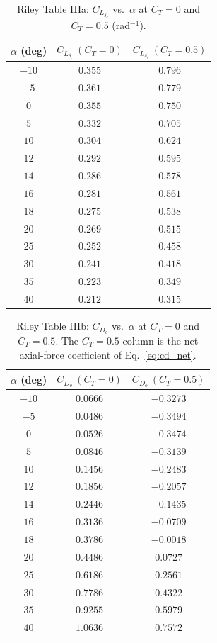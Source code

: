 \documentclass[journal ]{new-aiaa}
\begin{document}
\begin{table}[H]
\centering
\caption{Riley Table IIIa: $C_{L_{\delta_e}}$ vs.\ $\alpha$ at $C_T = 0$ and $C_T = 0.5$ (rad$^{-1}$).}
\label{tab:riley_clde}
\begin{tabular}{ccc}
\toprule
$\alpha$ (deg) & $C_{L_{\delta_e}}\ (C_T{=}0)$ & $C_{L_{\delta_e}}\ (C_T{=}0.5)$ \\
\midrule
$-10$ & $0.355$ & $0.796$ \\
$-5$  & $0.361$ & $0.779$ \\
$ 0$  & $0.355$ & $0.750$ \\
$ 5$  & $0.332$ & $0.705$ \\
$10$  & $0.304$ & $0.624$ \\
$12$  & $0.292$ & $0.595$ \\
$14$  & $0.286$ & $0.578$ \\
$16$  & $0.281$ & $0.561$ \\
$18$  & $0.275$ & $0.538$ \\
$20$  & $0.269$ & $0.515$ \\
$25$  & $0.252$ & $0.458$ \\
$30$  & $0.241$ & $0.418$ \\
$35$  & $0.223$ & $0.349$ \\
$40$  & $0.212$ & $0.315$ \\
\bottomrule
\end{tabular}
\end{table}

\begin{table}[H]
\centering
\caption{Riley Table IIIb: $C_{D_o}$ vs.\ $\alpha$ at $C_T = 0$ and $C_T = 0.5$. The $C_T = 0.5$ column is the net axial-force coefficient of Eq.~\eqref{eq:cd_net}.}
\label{tab:riley_cd}
\begin{tabular}{ccc}
\toprule
$\alpha$ (deg) & $C_{D_o}\ (C_T{=}0)$ & $C_{D_o}\ (C_T{=}0.5)$ \\
\midrule
$-10$ & $ 0.0666$ & $-0.3273$ \\
$-5$  & $ 0.0486$ & $-0.3494$ \\
$ 0$  & $ 0.0526$ & $-0.3474$ \\
$ 5$  & $ 0.0846$ & $-0.3139$ \\
$10$  & $ 0.1456$ & $-0.2483$ \\
$12$  & $ 0.1856$ & $-0.2057$ \\
$14$  & $ 0.2446$ & $-0.1435$ \\
$16$  & $ 0.3136$ & $-0.0709$ \\
$18$  & $ 0.3786$ & $-0.0018$ \\
$20$  & $ 0.4486$ & $ 0.0727$ \\
$25$  & $ 0.6186$ & $ 0.2561$ \\
$30$  & $ 0.7786$ & $ 0.4322$ \\
$35$  & $ 0.9255$ & $ 0.5979$ \\
$40$  & $ 1.0636$ & $ 0.7572$ \\
\bottomrule
\end{tabular}
\end{table}
\end{document}
